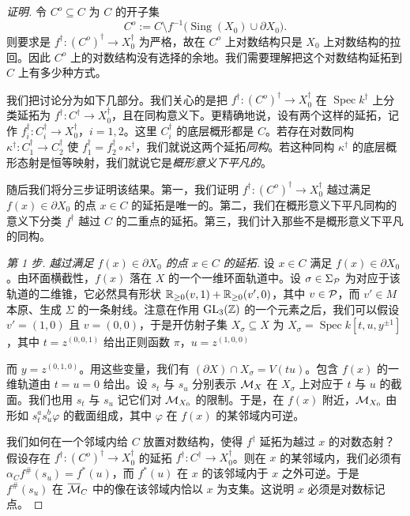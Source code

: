 \begin{proof}[证明]
令 $C^o\subseteq C$ 为 $C$ 的开子集
\[
C^o:=C\setminus f^{-1}\big(\operatorname{Sing}(X_0)\cup\partial X_0\big).
\]
则要求是 $f^\dagger:(C^o)^\dagger\to X_0^\dagger$ 为严格，故在 $C^o$ 上对数结构只是 $X_0$ 上对数结构的拉回。因此 $C^o$ 上的对数结构没有选择的余地。我们需要理解把这个对数结构延拓到 $C$ 上有多少种方式。

我们把讨论分为如下几部分。我们关心的是把 $f^\dagger:(C^o)^\dagger\to X_0^\dagger$ 在 $\operatorname{Spec}k^\dagger$ 上分类延拓为 $f^\dagger:C^\dagger\to X_0^\dagger$，且在同构意义下。更精确地说，设有两个这样的延拓，记作 $f_i^\dagger:C_i^\dagger\to X_0^\dagger$，$i=1,2$。这里 $C_i^\dagger$ 的底层概形都是 $C$。若存在对数同构 $\kappa^\dagger:C_1^\dagger\to C_2^\dagger$ 使 $f_1^\dagger=f_2^\dagger\circ\kappa^\dagger$，我们就说这两个延拓\emph{同构}。若这种同构 $\kappa^\dagger$ 的底层概形态射是恒等映射，我们就说它是\emph{概形意义下平凡的}。

随后我们将分三步证明该结果。第一，我们证明 $f^\dagger:(C^o)^\dagger\to X_0^\dagger$ 越过满足 $f(x)\in\partial X_0$ 的点 $x\in C$ 的延拓是唯一的。第二，我们在概形意义下平凡同构的意义下分类 $f^\dagger$ 越过 $C$ 的二重点的延拓。第三，我们计入那些不是概形意义下平凡的同构。

\emph{第 1 步. 越过满足 $f(x)\in\partial X_0$ 的点 $x\in C$ 的延拓.} 设 $x\in C$ 满足 $f(x)\in\partial X_0$。由环面横截性，$f(x)$ 落在 $X$ 的一个一维环面轨道中。设 $\sigma\in\Sigma_{\mathcal{P}}$ 为对应于该轨道的二维锥，它必然具有形状 $\mathbb{R}_{\ge0}(v,1)+\mathbb{R}_{\ge0}(v',0)$，其中 $v\in\mathcal{P}$，而 $v'\in M$ 本原、生成 $\Sigma$ 的一条射线。注意在作用 $\mathrm{GL}_3(\mathbb{Z})$ 的一个元素之后，我们可以假设 $v'=(1,0)$ 且 $v=(0,0)$，于是开仿射子集 $X_\sigma\subseteq X$ 为 $X_\sigma=\operatorname{Spec}k[t,u,y^{\pm1}]$，其中 $t=z^{(0,0,1)}$ 给出正则函数 $\pi$，$u=z^{(1,0,0)}$

而 $y=z^{(0,1,0)}$。用这些变量，我们有 $(\partial X)\cap X_\sigma=V(tu)$。包含 $f(x)$ 的一维轨道由 $t=u=0$ 给出。设 $s_t$ 与 $s_u$ 分别表示 $\mathcal{M}_X$ 在 $X_\sigma$ 上对应于 $t$ 与 $u$ 的截面。我们也用 $s_t$ 与 $s_u$ 记它们对 $\mathcal{M}_{X_0}$ 的限制。于是，在 $f(x)$ 附近，$\mathcal{M}_{X_0}$ 由形如 $s_t^as_u^b\varphi$ 的截面组成，其中 $\varphi$ 在 $f(x)$ 的某邻域内可逆。

我们如何在一个邻域内给 $C$ 放置对数结构，使得 $f^\dagger$ 延拓为越过 $x$ 的对数态射？假设存在 $f^\dagger:(C^o)^\dagger\to X_0^\dagger$ 的延拓 $f^\dagger:C^\dagger\to X_0^\dagger$。则在 $x$ 的某邻域内，我们必须有 $\alpha_C f^\#(s_u)=f^*(u)$，而 $f^*(u)$ 在 $x$ 的该邻域内于 $x$ 之外可逆。于是 $f^\#(s_u)$ 在 $\overline{\mathcal{M}}_C$ 中的像在该邻域内恰以 $x$ 为支集。这说明 $x$ 必须是对数标记点。


\end{proof}
